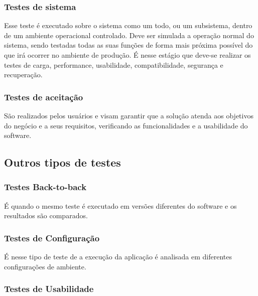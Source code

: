 \subsubsection{Testes de sistema}

Esse teste é executado sobre o sistema como um todo, ou um subsistema, dentro de um ambiente operacional controlado. Deve ser simulada a operação normal do sistema, sendo testadas todas as suas funções de forma mais próxima possível do que irá ocorrer no ambiente de produção. É nesse estágio que deve-se realizar os testes de carga, performance, usabilidade, compatibilidade, segurança e recuperação.

\subsubsection{Testes de aceitação}

São realizados pelos usuários e visam garantir que a solução atenda aos objetivos do negócio e a seus requisitos, verificando as funcionalidades e a usabilidade do software.

\subsection{Outros tipos de testes}


\subsubsection{Testes Back-to-back}

É quando o mesmo teste é executado em versões diferentes do software e os resultados são comparados.

\subsubsection{Testes de Configuração}

É nesse tipo de teste de a execução da aplicação é analisada em diferentes configurações de ambiente.

\subsubsection{Testes de Usabilidade}

